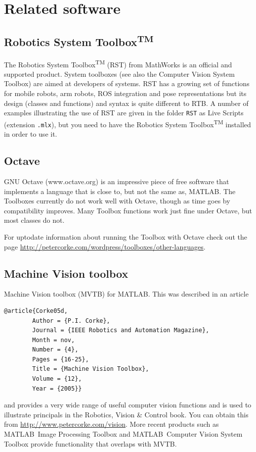 \documentclass[a4paper,twoside]{report}
\def\Mlab{MATLAB}
\begin{document}
{\section{Related software}

\subsection{Robotics System Toolbox\textsuperscript{TM}}
The Robotics System Toolbox\textsuperscript{TM} (RST) from MathWorks is an official and supported product.  System toolboxes (see also the Computer Vision System Toolbox) are aimed at developers of systems. 
RST has a growing set of functions for mobile robots, arm robots, ROS integration and pose representations but its design (classes and functions) and syntax is quite different to RTB.  A number of examples illustrating the use of RST are given in the folder \texttt{RST} as Live Scripts (extension \texttt{.mlx}), but you need to have the  Robotics System Toolbox\textsuperscript{TM} installed in order to use it.

\subsection{Octave}
GNU Octave (www.octave.org) is an impressive piece of free software that implements a language that is close to, but not the same as, \Mlab. The Toolboxes currently do not work well with Octave, though as time goes by compatibility improves.  
Many Toolbox functions work just fine under Octave, but most classes do not.

For uptodate information about running the Toolbox with Octave check out the page \url{http://petercorke.com/wordpress/toolboxes/other-languages}.

\subsection{Machine Vision toolbox}
Machine Vision toolbox (MVTB) for {\Mlab}.  This was described in an article
\begin{verbatim}
@article{Corke05d,
        Author = {P.I. Corke},
        Journal = {IEEE Robotics and Automation Magazine},
        Month = nov,
        Number = {4},
        Pages = {16-25},
        Title = {Machine Vision Toolbox},
        Volume = {12},
        Year = {2005}}
\end{verbatim}
and provides a very wide range of useful computer vision functions and is used to illustrate principals in the Robotics, Vision \& Control book.  You can obtain this from \url{http://www.petercorke.com/vision}.
More recent products such as \Mlab\ Image Processing
Toolbox and \Mlab\ Computer Vision System Toolbox provide functionality that overlaps with MVTB.  

}
\end{document}
